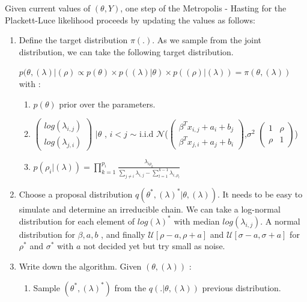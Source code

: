 \documentclass[12pt]{ociamthesis}  %
\begin{document}
	Given current values of $(\theta, Y)$, one step of the Metropolis - Hasting for the Plackett-Luce likelihood proceeds by updating the values as follows:
	\begin{enumerate}
	
	\item Define the target distribution $\pi(.)$. As we sample from the joint distribution, we can take the following target distribution.
	
	$p(\theta, (\lambda)|(\rho) \propto p(\theta) \times p((\lambda) | \theta)\times p((\rho)|(\lambda)) = \pi(\theta, (\lambda))$ with :
	\begin{enumerate}
	\item $p(\theta)$ prior over the parameters.
	
	\item 
	\(
	\begin{pmatrix}
	log(\lambda_{i,j}) \\
	log(\lambda_{j,i})
	\end{pmatrix}
	\) $|\theta$ , $i < j$ $\sim $ i.i.d $\mathcal{N}$($\begin{pmatrix} \beta^{T}x_{i,j} + a_{i} + b_{j} \\  \beta^{T}x_{j,i} + a_{j} + b_{i} \end{pmatrix}$,$\sigma^{2}$ $\begin{pmatrix} 1 & \rho \\ \rho & 1 \end{pmatrix}$)
	
	\item $p(\rho_{i} | (\lambda)) = \prod_{k = 1}^{p_{i}}\frac{\lambda_{i\rho_{k}}}{\sum_{j \neq i}\lambda_{i,j} - \sum_{l = 1}^{k - 1}\lambda_{i,\rho_{l}}  } $
	\end{enumerate}
	\item Choose a proposal distribution $q(\theta^{*}, (\lambda)^{*} |\theta, (\lambda))$. It needs to be easy to simulate and determine an irreducible chain. We can take a log-normal distribution for each element of $log(\lambda)^{*}$ with median $log(\lambda_{i,j})$. A normal distribution for \boldmath $\beta, a, b$ \unboldmath, and finally $\mathcal{U}[\rho - a, \rho + a]$ and $\mathcal{U}[\sigma - a, \sigma + a]$ for $\rho^{*}$ and $\sigma^{*}$ with $a$ not decided yet but try small as noise.
	
	\item Write down the algorithm. Given $(\theta, (\lambda))$ :
	\begin{enumerate}
	\item Sample $(\theta^{*}, (\lambda)^{*})$ from the $q(.|\theta, (\lambda))$ previous distribution.
	

\end{enumerate}
\end{enumerate}
\end{document}
